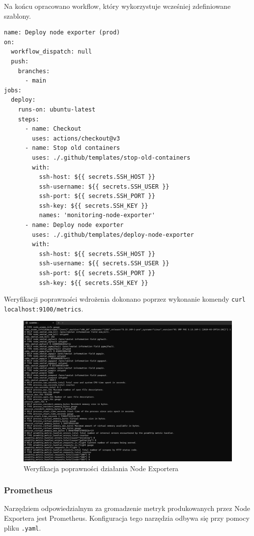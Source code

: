 \documentclass{article}
\begin{document}
Na końcu opracowano workflow, który wykorzystuje wcześniej zdefiniowane szablony.

\begin{lstlisting}[caption=Plik \texttt{.github/workflows/prod-deploy-node-exporter.yml}]
name: Deploy node exporter (prod)
on:
  workflow_dispatch: null
  push:
    branches:
      - main
jobs:
  deploy:
    runs-on: ubuntu-latest
    steps:
      - name: Checkout
        uses: actions/checkout@v3
      - name: Stop old containers
        uses: ./.github/templates/stop-old-containers
        with:
          ssh-host: ${{ secrets.SSH_HOST }}
          ssh-username: ${{ secrets.SSH_USER }}
          ssh-port: ${{ secrets.SSH_PORT }}
          ssh-key: ${{ secrets.SSH_KEY }}
          names: 'monitoring-node-exporter'
      - name: Deploy node exporter
        uses: ./.github/templates/deploy-node-exporter
        with:
          ssh-host: ${{ secrets.SSH_HOST }}
          ssh-username: ${{ secrets.SSH_USER }}
          ssh-port: ${{ secrets.SSH_PORT }}
          ssh-key: ${{ secrets.SSH_KEY }}

\end{lstlisting}

Weryfikacji poprawności wdrożenia dokonano poprzez wykonanie komendy \lstinline|curl localhost:9100/metrics|.

\begin{figure}[H]
    \centering
    \includegraphics[width=0.75\linewidth]{metrykiNodeExporterRaw.png}
    \caption{Weryfikacja poprawności działania Node Exportera}
    \label{fig:enter-label}
\end{figure}

\subsubsection{Prometheus}

Narzędziem odpowiedzialnym za gromadzenie metryk produkowanych przez Node Exportera jest Prometheus. Konfiguracja tego narzędzia odbywa się przy pomocy pliku \lstinline|.yaml|.
\end{document}
